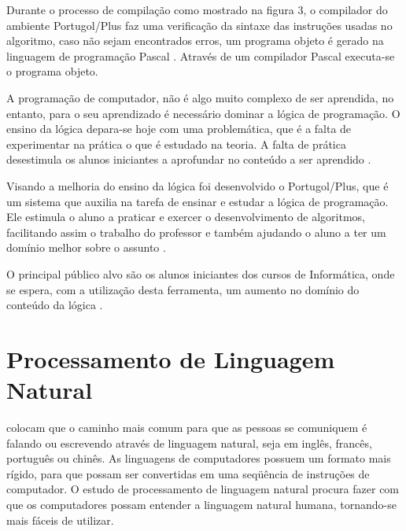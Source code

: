 \begin{enumerate}
Durante o processo de compilação como mostrado na figura 3, o compilador do
ambiente Portugol/Plus faz uma verificação da sintaxe das instruções usadas no
algoritmo, caso não sejam encontrados erros, um programa objeto é gerado na
linguagem de programação Pascal \cite{farreretal1995}. Através de um compilador
Pascal executa-se o programa objeto.

\end{enumerate}

A programação de computador, não é algo muito complexo de ser aprendida, no
entanto, para o seu aprendizado é necessário dominar a lógica de programação.
O ensino da lógica depara-se hoje com uma problemática, que é a falta de
experimentar na prática o que é estudado na teoria. A falta de prática
desestimula os alunos iniciantes a aprofundar no conteúdo a ser aprendido
\cite{118}.

Visando a melhoria do ensino da lógica foi desenvolvido o Portugol/Plus, que
é um sistema que auxilia na tarefa de ensinar e estudar a lógica de programação.
Ele estimula o aluno a praticar e exercer o desenvolvimento de algoritmos,
facilitando assim o trabalho do professor e também ajudando o aluno a ter um
domínio melhor sobre o assunto \cite{118}.

O principal público alvo são os alunos iniciantes dos cursos de Informática,
onde se espera, com a utilização desta ferramenta, um aumento no domínio do
conteúdo da lógica \cite{118}.

\section{Processamento de Linguagem Natural}

 colocam que o caminho mais comum para que as
pessoas se comuniquem é falando ou escrevendo através de linguagem natural, seja
em inglês, francês, português ou chinês. As linguagens de computadores possuem
um formato mais rígido, para que possam ser convertidas em uma seqüência de
instruções de computador. O estudo de processamento de linguagem natural procura
fazer com que os computadores possam entender a linguagem natural humana,
tornando-se mais fáceis de utilizar.
